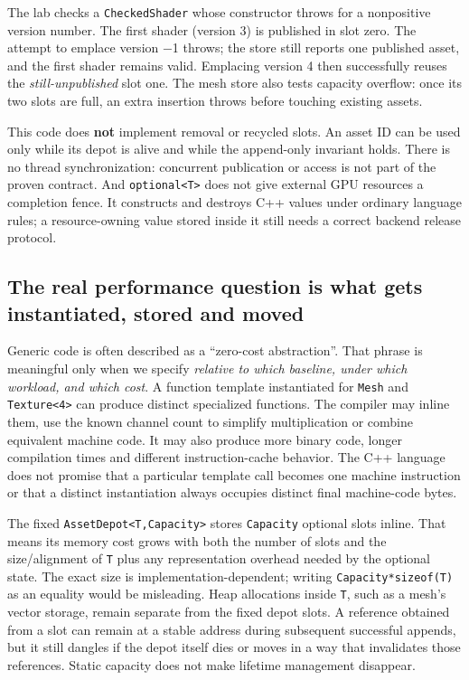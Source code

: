The lab checks a \texttt{CheckedShader} whose constructor throws for a nonpositive version number. The first shader (version 3) is published in slot zero. The attempt to emplace version −1 throws; the store still reports one published asset, and the first shader remains valid. Emplacing version 4 then successfully reuses the \emph{still-unpublished} slot one. The mesh store also tests capacity overflow: once its two slots are full, an extra insertion throws before touching existing assets.

This code does \textbf{not} implement removal or recycled slots. An asset ID can be used only while its depot is alive and while the append-only invariant holds. There is no thread synchronization: concurrent publication or access is not part of the proven contract. And \texttt{optional\textless{}T\textgreater{}} does not give external GPU resources a completion fence. It constructs and destroys C++ values under ordinary language rules; a resource-owning value stored inside it still needs a correct backend release protocol.

\subsection{The real performance question is what gets instantiated, stored and moved}\label{01-foundations-i-ch005-the-real-performance-question-is-what-gets-instantiated-stored-and-moved}

Generic code is often described as a ``zero-cost abstraction''. That phrase is meaningful only when we specify \emph{relative to which baseline, under which workload, and which cost}. A function template instantiated for \texttt{Mesh} and \texttt{Texture\textless{}4\textgreater{}} can produce distinct specialized functions. The compiler may inline them, use the known channel count to simplify multiplication or combine equivalent machine code. It may also produce more binary code, longer compilation times and different instruction-cache behavior. The C++ language does not promise that a particular template call becomes one machine instruction or that a distinct instantiation always occupies distinct final machine-code bytes.

The fixed \texttt{AssetDepot\textless{}T,Capacity\textgreater{}} stores \texttt{Capacity} optional slots inline. That means its memory cost grows with both the number of slots and the size/alignment of \texttt{T} plus any representation overhead needed by the optional state. The exact size is implementation-dependent; writing \texttt{Capacity*sizeof(T)} as an equality would be misleading. Heap allocations inside \texttt{T}, such as a mesh's vector storage, remain separate from the fixed depot slots. A reference obtained from a slot can remain at a stable address during subsequent successful appends, but it still dangles if the depot itself dies or moves in a way that invalidates those references. Static capacity does not make lifetime management disappear.

